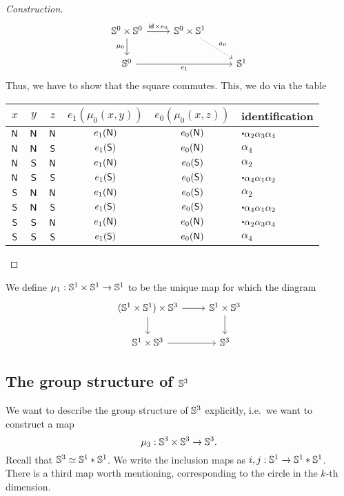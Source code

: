 \documentclass{article}
\newcommand{\join}[2]{{#1}*{#2}}
\begin{document}
\begin{proof}[Construction]
\begin{equation*}
\begin{tikzcd}
\Sn^0\times\Sn^0 \arrow[d,swap,"\mu_0"] \arrow[r,"\idfunc\times e_0"] & \Sn^0\times\Sn^1 \arrow[dr,densely dotted,"a_0"] \\
\Sn^0 \arrow[rr,swap,"e_1"] & & \Sn^1
\end{tikzcd}
\end{equation*}
Thus, we have to show that the square commutes. This, we do via the table
\begin{center}
\begin{tabular}{ccc|cc|l}
$x$ & $y$ & $z$ & $e_1(\mu_0(x,y))$ & $e_0(\mu_0(x,z))$ & identification \\
\midrule
$\mathsf{N}$ & $\mathsf{N}$ & $\mathsf{N}$ & $e_1(\mathsf{N})$ & $e_0(\mathsf{N})$ & $\ct{\alpha_2}{\alpha_3}{\alpha_4}$ \\
$\mathsf{N}$ & $\mathsf{N}$ & $\mathsf{S}$ & $e_1(\mathsf{S})$ & $e_0(\mathsf{N})$ & $\alpha_4$ \\
$\mathsf{N}$ & $\mathsf{S}$ & $\mathsf{N}$ & $e_1(\mathsf{N})$ & $e_0(\mathsf{S})$ & $\alpha_2$ \\
$\mathsf{N}$ & $\mathsf{S}$ & $\mathsf{S}$ & $e_1(\mathsf{S})$ & $e_0(\mathsf{S})$ & $\ct{\alpha_4}{\alpha_1}{\alpha_2}$ \\
$\mathsf{S}$ & $\mathsf{N}$ & $\mathsf{N}$ & $e_1(\mathsf{N})$ & $e_0(\mathsf{S})$ & $\alpha_2$ \\
$\mathsf{S}$ & $\mathsf{N}$ & $\mathsf{S}$ & $e_1(\mathsf{S})$ & $e_0(\mathsf{S})$ & $\ct{\alpha_4}{\alpha_1}{\alpha_2}$ \\
$\mathsf{S}$ & $\mathsf{S}$ & $\mathsf{N}$ & $e_1(\mathsf{N})$ & $e_0(\mathsf{N})$ & $\ct{\alpha_2}{\alpha_3}{\alpha_4}$ \\
$\mathsf{S}$ & $\mathsf{S}$ & $\mathsf{S}$ & $e_1(\mathsf{S})$ & $e_0(\mathsf{N})$ & $\alpha_4$
\end{tabular}
\end{center}
\end{proof}

\begin{defn}
We define $\mu_1:\mathbb{S}^1\times\mathbb{S}^1\to\mathbb{S}^1$ to be the unique map for which the
diagram
\begin{equation*}
\begin{tikzcd}
(\Sn^1\times\Sn^1)\times\Sn^3 \arrow[r] \arrow[d] & \Sn^1\times\Sn^3 \arrow[d] \\
\Sn^1\times\Sn^3 \arrow[r] & \Sn^3
\end{tikzcd}
\end{equation*}
\end{defn}

\subsection{The group structure of $\mathbb{S}^3$}
We want to describe the group structure of $\mathbb{S}^3$ explicitly, i.e.~we want to
construct a map
\begin{equation*}
\mu_3 : \mathbb{S}^3\times \mathbb{S}^3\to\mathbb{S}^3.
\end{equation*}
Recall that $\eqv{\Sn^3}{\join{\Sn^1}{\Sn^1}}$. We write the inclusion maps
as $i,j:\Sn^1\to \join{\Sn^1}{\Sn^1}$. There is a third map worth mentioning,
corresponding to the circle in the $k$-th dimension.
\end{document}
